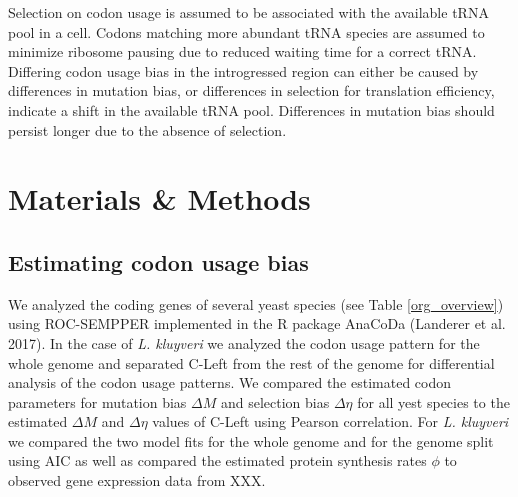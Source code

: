 \documentclass[12pt,draft]{article}
\begin{document}
Selection on codon usage is assumed to be associated with the available tRNA pool in a cell. 
Codons matching more abundant tRNA species are assumed to minimize ribosome pausing due to reduced waiting time for a correct tRNA. 
Differing codon usage bias in the introgressed region can either be caused by differences in mutation bias, or differences in selection for translation efficiency, indicate a shift in the available tRNA pool.
Differences in mutation bias should persist longer due to the absence of selection.   

	
\section{Materials \& Methods}

\subsection{Estimating codon usage bias}
We analyzed the coding genes of several yeast species (see Table \ref{org_overview}) using ROC-SEMPPER \cite{gilchrist2015} implemented in the R package AnaCoDa (Landerer et al. 2017).
In the case of \textit{L. kluyveri} we analyzed the codon usage pattern for the whole genome and separated C-Left from the rest of the genome for differential analysis of the codon usage patterns.
We compared the estimated codon parameters for mutation bias $\Delta M$ and selection bias $\Delta \eta$ for all yest species to the estimated $\Delta M$ and $\Delta \eta$ values of C-Left using Pearson correlation.
For \textit{L. kluyveri} we compared the two model fits for the whole genome and for the genome split using AIC as well as compared the estimated protein synthesis rates $\phi$ to observed gene expression data from XXX.
\end{document}
